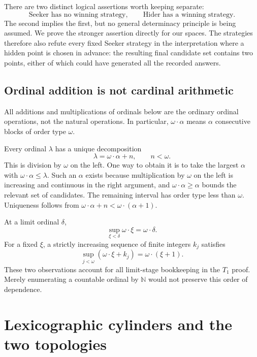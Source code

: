 \documentclass[11pt,a4paper]{article}
\theoremstyle{definition}
\theoremstyle{remark}
\newcommand{\N}{\mathbb N}
\begin{document}
There are two distinct logical assertions worth keeping separate:
\[
 \text{Seeker has no winning strategy},\qquad
 \text{Hider has a winning strategy}.
\]
The second implies the first, but no general determinacy principle is being
assumed. We prove the stronger assertion directly for our spaces. The strategies
therefore also refute every fixed Seeker strategy in the interpretation where a
hidden point is chosen in advance: the resulting final candidate set contains
two points, either of which could have generated all the recorded answers.

\subsection{Ordinal addition is not cardinal arithmetic}
All additions and multiplications of ordinals below are the ordinary ordinal
operations, not the natural operations. In particular, $\omega\cdot\alpha$
means $\alpha$ consecutive blocks of order type $\omega$.

Every ordinal $\lambda$ has a unique decomposition
\begin{equation}\label{eq:division}
                    \lambda=\omega\cdot\alpha+n,
           \qquad n<\omega.
\end{equation}
This is division by $\omega$ on the left. One way to obtain it is to take the
largest $\alpha$ with $\omega\cdot\alpha\leq\lambda$. Such an $\alpha$ exists
because multiplication by $\omega$ on the left is increasing and continuous in
the right argument, and $\omega\cdot\alpha\geq\alpha$ bounds the relevant
set of candidates. The remaining interval has order type less than $\omega$.
Uniqueness follows from
$\omega\cdot\alpha+n<\omega\cdot(\alpha+1)$.

At a limit ordinal $\delta$,
\begin{equation}\label{eq:continuity}
             \sup_{\xi<\delta}\omega\cdot\xi=\omega\cdot\delta.
\end{equation}
For a fixed $\xi$, a strictly increasing sequence of finite integers $k_j$
satisfies
\[
 \sup_{j<\omega}(\omega\cdot\xi+k_j)=\omega\cdot(\xi+1).
\]
These two observations account for all limit-stage bookkeeping in the $T_1$
proof. Merely enumerating a countable ordinal by $\N$ would not preserve this
order of dependence.

\section{Lexicographic cylinders and the two topologies}
\end{document}
